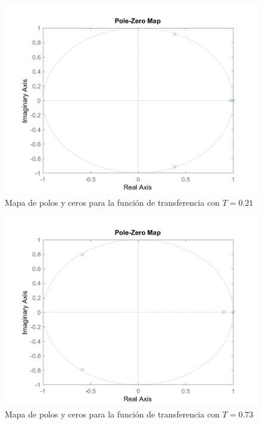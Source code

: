 \documentclass[journal]{IEEEtran}
\begin{document}
\begin{figure}[h!]
\caption{Mapa de polos y ceros para la función de transferencia con $T=0.21$\label{fig:pzGd}}
  \centering
\includegraphics[scale=0.18]{tf/pzmap_Gd.jpg}
\end{figure}

\begin{figure}[h!]
\caption{Mapa de polos y ceros para la función de transferencia con $T=0.73$\label{fig:pzGd1}}
  \centering
\includegraphics[scale=0.18]{tf/pzmap_Gd_1.jpg}
\end{figure}
\end{document}
